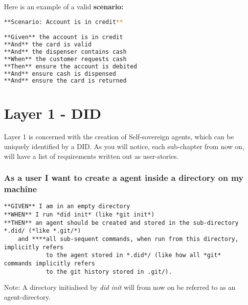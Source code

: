 Here is an example of a valid \textbf{scenario:}

\begin{lstlisting}[language=bash]
**Scenario: Account is in credit**

**Given** the account is in credit
**And** the card is valid
**And** the dispenser contains cash
**When** the customer requests cash
**Then** ensure the account is debited
**And** ensure cash is dispensed
**And** ensure the card is returned
\end{lstlisting}




\pagebreak




\hypertarget{layer-1---did}{%
\section{Layer 1 - DID}\label{layer-1---did}}

Layer 1 is concerned with the creation of Self-sovereign agents, which
can be uniquely identified by a DID. As you will notice, each
sub-chapter from now on, will have a list of requirements written out as
user-stories.

\hypertarget{as-a-user-i-want-to-create-a-agent-inside-a-directory-on-my-machine}{%
\subsubsection{\texorpdfstring{\textbf{As a user I want to create a
agent inside a directory on my
machine}}{As a user I want to create a agent inside a directory on my machine}}\label{as-a-user-i-want-to-create-a-agent-inside-a-directory-on-my-machine}}

\begin{lstlisting}
**GIVEN** I am in an empty directory
**WHEN** I run *did init* (like *git init*)
**THEN** an agent should be created and stored in the sub-directory *.did/ (*like *.git/*)
    and ****all sub-sequent commands, when run from this directory, implicitly refers 
            to the agent stored in *.did*/ (like how all *git* commands implicitly refers
            to the git history stored in .git/).
\end{lstlisting}

Note: A directory initialised by \emph{did init} will from now on be
referred to as an agent-directory.

